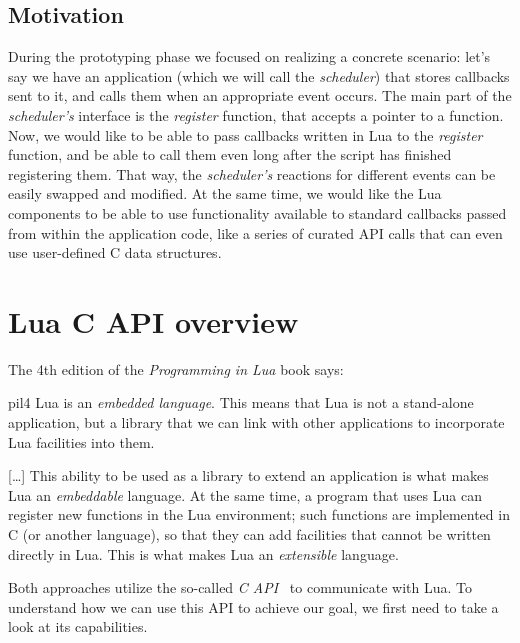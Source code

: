 \documentclass[polish, english]{iithesis}
\begin{document}
  \section{Motivation}
During the prototyping phase we focused on realizing a concrete scenario: 
let's say we have an application (which we will call the \textit{scheduler}) that stores callbacks sent to it, and calls them when an appropriate event occurs.
The main part of the \textit{scheduler's} interface is the \textit{register} function, that accepts a pointer to a function.
Now, we would like to be able to pass callbacks written in Lua to the \textit{register} function, and be able to call them even long after the script has finished registering them. 
That way, the \textit{scheduler's} reactions for different events can be easily swapped and modified. 
At the same time, we would like the Lua components to be able to use functionality available to standard callbacks passed from within the application code, like a series of curated API calls that can even use user-defined C data structures.
\chapter{Lua C API overview}
  The 4th edition of the \textit{Programming in Lua} book says:
  \begin{displaycquote}{pil4}
    Lua is an \textit{embedded language}. 
    This means that Lua is not a stand-alone application, but a library that we can link with other applications to incorporate Lua facilities into them.

    [\ldots] This ability to be used as a library to extend an application is what makes Lua an \textit{embeddable} language. 
    At the same time, a program that uses Lua can register new functions in the Lua environment; such functions are implemented in C (or another language), so that they can add facilities that cannot be written directly in Lua. 
    This is what makes Lua an \textit{extensible} language. 
  \end{displaycquote}
  Both approaches utilize the so-called \textit{C API}~\cite{lua-ref} to communicate with Lua.
  To understand how we can use this API to achieve our goal, we first need to take a look at its capabilities.
\end{document}
